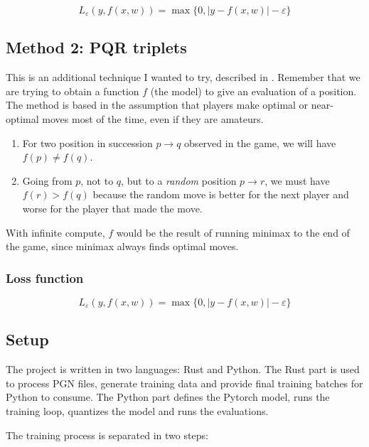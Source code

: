 \[
L_\varepsilon(y,f(x,w))=
\max\{0, |y-f(x,w)|-\varepsilon\}
\]


\subsection{Method 2: PQR triplets}

This is an additional technique I wanted to try, described in \cite{dlchess:2014}. Remember that we are trying to obtain a function $f$ (the model) to give an evaluation of a position. The method is based in the assumption that players make optimal or near-optimal moves most of the time, even if they are amateurs.

\begin{enumerate}
\item For two position in succession $p \rightarrow q$  observed in the game, we will have $f(p) \neq f(q)$.
\item Going from $p$, not to $q$, but to a \textit{random} position $p \rightarrow r$, we must have $f(r) > f(q)$ because the random move is better for the next player and worse for the player that made the move.
\end{enumerate}

With infinite compute, $f$ would be the result of running minimax to the end of the game, since minimax always finds optimal moves.


\subsubsection{Loss function}


\[
L_\varepsilon(y,f(x,w))=
\max\{0, |y-f(x,w)|-\varepsilon\}
\]


\subsection{Setup}



The project is written in two languages: Rust and Python. The Rust part is used to process PGN files, generate training data and provide final training batches for Python to consume. The Python part defines the Pytorch model, runs the training loop, quantizes the model and runs the evaluations.

The training process is separated in two steps:

